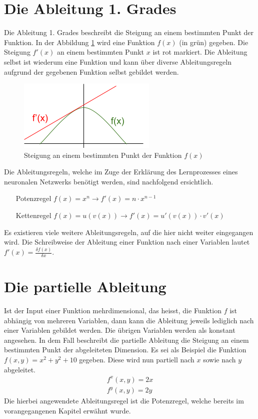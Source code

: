 \section{Die Ableitung 1. Grades}
Die Ableitung 1. Grades beschreibt die Steigung an einem bestimmten Punkt der Funktion. In der Abbildung \ref{fig:00_steigung_an_punkt}
wird eine Funktion $f(x)$ (in grün) gegeben. Die Steigung $f'(x)$ an einem bestimmten Punkt $x$ ist rot markiert.
Die Ableitung selbst ist wiederum eine Funktion und kann über diverse Ableitungsregeln aufgrund der gegebenen Funktion
selbst gebildet werden.
\begin{figure}[h!]
    \begin{center}
        \includegraphics[width=0.25\linewidth]{../common/02_appendix/00_resources/00_derivation.png}
    \end{center}
    \caption{Steigung an einem bestimmten Punkt der Funktion $f(x)$}
    \label{fig:00_steigung_an_punkt}
\end{figure}

Die Ableitungsregeln, welche im Zuge der Erklärung des Lernprozesses eines neuronalen Netzwerks benötigt werden,
sind nachfolgend ersichtlich.
\begin{itemize}
    \item[Potenzregel] $f(x) = x^n \longrightarrow f'(x) = n \cdot x^{n-1}$\label{abl:potenzregel}
    \item[Kettenregel] $f(x) = u(v(x)) \longrightarrow f'(x) = u'(v(x)) \cdot v'(x)$\label{abl:kettenregel}
\end{itemize}
Es existieren viele weitere Ableitungsregeln, auf die hier nicht weiter eingegangen wird.
Die Schreibweise der Ableitung einer Funktion nach einer Variablen lautet $f'(x) = \frac{\delta f(x)}{\delta x}$.

\section{Die partielle Ableitung}
Ist der Input einer Funktion mehrdimensional, das heisst, die Funktion $f$ ist abhängig von mehreren Variablen, dann
kann die Ableitung jeweils lediglich nach einer Variablen gebildet werden. Die übrigen Variablen werden als konstant
angesehen. In dem Fall beschreibt die partielle Ableitung die Steigung an einem bestimmten Punkt der abgeleiteten
Dimension. Es sei als Beispiel die Funktion $f(x, y) = x^2 + y^2 + 10$ gegeben. Diese wird nun partiell nach $x$ sowie
nach $y$ abgeleitet.
\begin{align}
    f^x(x, y) = 2x\\
    f^y(x, y) = 2y
\end{align}
Die hierbei angewendete Ableitungsregel ist die Potenzregel, welche bereits im vorangegangenen Kapitel erwähnt wurde.

